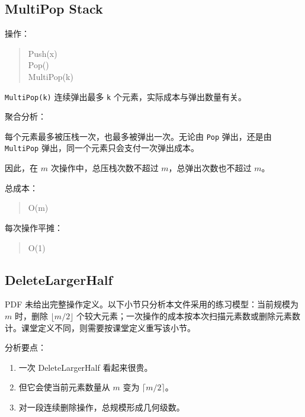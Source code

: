 \documentclass[UTF8,zihao=-4]{ctexart}
\begin{document}
\subsection*{MultiPop Stack}

操作：

\begin{quote}
\small\ttfamily\raggedright
\relax Push(x)\\
\relax Pop()\\
\relax MultiPop(k)\\
\end{quote}

\texttt{MultiPop(k)} 连续弹出最多 \texttt{k} 个元素，实际成本与弹出数量有关。

聚合分析：

每个元素最多被压栈一次，也最多被弹出一次。无论由 \texttt{Pop} 弹出，还是由 \texttt{MultiPop} 弹出，同一个元素只会支付一次弹出成本。

因此，在 $m$ 次操作中，总压栈次数不超过 $m$，总弹出次数也不超过 $m$。

总成本：

\begin{quote}
\small\ttfamily\raggedright
\relax O(m)\\
\end{quote}

每次操作平摊：

\begin{quote}
\small\ttfamily\raggedright
\relax O(1)\\
\end{quote}

\subsection*{DeleteLargerHalf}

PDF 未给出完整操作定义。以下小节只分析本文件采用的练习模型：当前规模为 $m$ 时，删除 $\lfloor m/2 \rfloor$ 个较大元素；一次操作的成本按本次扫描元素数或删除元素数计。课堂定义不同，则需要按课堂定义重写该小节。

分析要点：

\begin{enumerate}
\item 一次 DeleteLargerHalf 看起来很贵。
\item 但它会使当前元素数量从 $m$ 变为 $\lceil m/2 \rceil$。
\item 对一段连续删除操作，总规模形成几何级数。
\end{enumerate}
\end{document}

